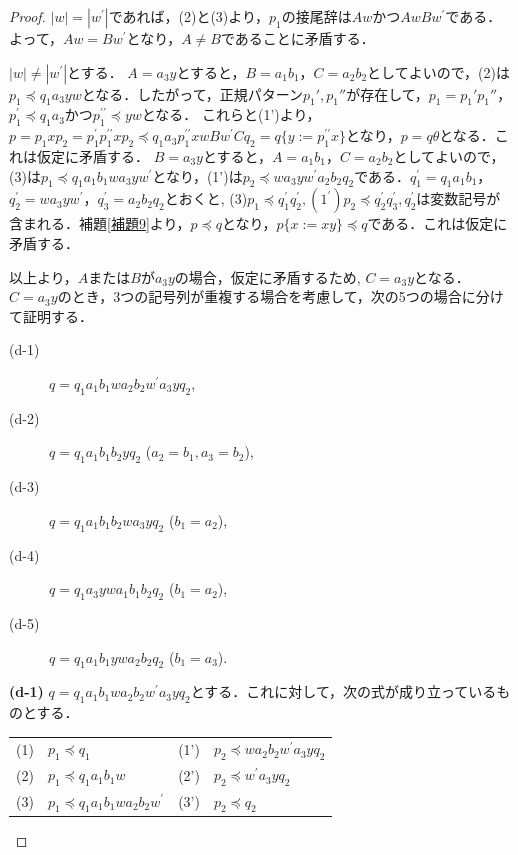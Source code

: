\begin{proof}
$|w|=|w^{\prime}|$であれば，(2)と(3)より，$p_{1}$の接尾辞は$Aw$かつ$AwBw^{\prime}$である．よって，$Aw=Bw^{\prime}$となり，$A \ne B$であることに矛盾する．

$|w| \ne |w^{\prime}|$とする．
$A=a_{3}y$とすると，$B=a_{1}b_{1}$，$C=a_{2}b_{2}$としてよいので，(2)は$p_{1} \preceq q_{1}a_{3}yw$となる．したがって，正規パターン$p_{1}', p_{1}''$が存在して，$p_{1}=p_{1}'p_{1}''$，$p_{1}^{\prime} \preceq q_{1}a_{3}$かつ$p_{1}^{\prime\prime} \preceq yw$となる．
これらと(1')より，$p=p_{1}xp_{2}=p_{1}^{\prime}p_{1}^{\prime\prime}xp_{2}\preceq q_{1}a_{3}p_{1}^{\prime\prime}xwBw^{\prime}Cq_{2}=q \{ y := p_{1}^{\prime\prime}x \}$となり，$p=q \theta$となる．これは仮定に矛盾する．
$B=a_{3}y$とすると，$A=a_{1}b_{1}$，$C=a_{2}b_{2}$としてよいので，(3)は$p_{1} \preceq q_{1}a_{1}b_{1}wa_{3}yw^{\prime}$となり，(1')は$p_{2} \preceq wa_{3}yw^{\prime}a_{2}b_{2}q_{2}$である．$q_{1}^{\prime}=q_{1}a_{1}b_{1}$，$q_{2}^{\prime}=wa_{3}yw^{\prime}$，$q_{3}^{\prime}=a_{2}b_{2}q_{2}$とおくと, (3)$p_{1} \preceq q_{1}^{\prime}q_{2}^{\prime}, (1^{\prime}) p_{2} \preceq q_{2}^{\prime}q_{3}^{\prime}, q_{2}^{\prime}$は変数記号が含まれる．補題\ref{補題9}より，$p \preceq q$となり，$p \{ x := xy \} \preceq q$である．これは仮定に矛盾する．

以上より，$A$または$B$が$a_{3}y$の場合，仮定に矛盾するため, $C=a_{3}y$となる．$C=a_{3}y$のとき，3つの記号列が重複する場合を考慮して，次の5つの場合に分けて証明する．

\begin{description}
\item[(d-1)] $q=q_{1}a_{1}b_{1}wa_{2}b_{2}w^{\prime}a_{3}yq_{2}$,
\item[(d-2)] $q=q_{1}a_{1}b_{1}b_{2}yq_{2}$ ($a_{2}=b_{1}, a_{3}=b_{2}$),
\item[(d-3)] $q=q_{1}a_{1}b_{1}b_{2}wa_{3}yq_{2}$ ($b_{1}=a_{2}$),
\item[(d-4)] $q=q_{1}a_{3}ywa_{1}b_{1}b_{2}q_{2}$ ($b_{1}=a_{2}$),
\item[(d-5)] $q=q_{1}a_{1}b_{1}ywa_{2}b_{2}q_{2}$ ($b_{1}=a_{3}$).
\end{description}

\textbf{(d-1)} $q=q_{1}a_{1}b_{1}wa_{2}b_{2}w^{\prime}a_{3}yq_{2}$とする．これに対して，次の式が成り立っているものとする．
\smallskip

\begin{tabular}{llll}
(1) & $p_{1} \preceq q_{1}$ & \hspace*{-30pt}(1') & \hspace*{-30pt}$p_{2} \preceq wa_{2}b_{2}w^{\prime}a_{3}yq_{2}$ \\
(2) & $p_{1} \preceq q_{1}a_{1}b_{1}w$ & \hspace*{-30pt}(2') & \hspace*{-30pt}$p_{2} \preceq w^{\prime}a_{3}yq_{2}$ \\
(3) & $p_{1} \preceq q_{1}a_{1}b_{1}wa_{2}b_{2}w^{\prime}$ & (3') & $p_{2} \preceq q_{2}$
\end{tabular}
\smallskip


\end{proof}
